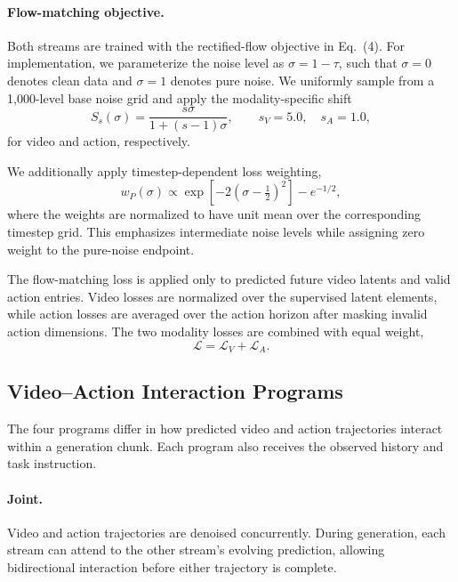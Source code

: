 \paragraph{Flow-matching objective.}
Both streams are trained with the rectified-flow objective in
Eq.~(4). For implementation, we parameterize the noise level as
$\sigma = 1-\tau$, such that $\sigma=0$ denotes clean data and
$\sigma=1$ denotes pure noise. We uniformly sample from a
1,000-level base noise grid and apply the modality-specific shift
\begin{equation}
S_s(\sigma)
=
\frac{s\sigma}{1+(s-1)\sigma},
\qquad
s_V=5.0,\quad s_A=1.0,
\end{equation}
for video and action, respectively.

We additionally apply timestep-dependent loss weighting,
\begin{equation}
w_P(\sigma)
\propto
\exp\!\left[-2\left(\sigma-\tfrac{1}{2}\right)^2\right]
-
e^{-1/2},
\end{equation}
where the weights are normalized to have unit mean over the
corresponding timestep grid. This emphasizes intermediate noise
levels while assigning zero weight to the pure-noise endpoint.

The flow-matching loss is applied only to predicted future video
latents and valid action entries. Video losses are normalized over
the supervised latent elements, while action losses are averaged
over the action horizon after masking invalid action dimensions.
The two modality losses are combined with equal weight,
\begin{equation}
\mathcal{L}
=
\mathcal{L}_{V}
+
\mathcal{L}_{A}.
\end{equation}


\subsection{Video--Action Interaction Programs}
\label{sec:supp-programs}

The four programs differ in how predicted video and action
trajectories interact within a generation chunk. Each program
also receives the observed history and task instruction.

\paragraph{Joint.}
Video and action trajectories are denoised concurrently. During
generation, each stream can attend to the other stream's evolving
prediction, allowing bidirectional interaction before either
trajectory is complete.

